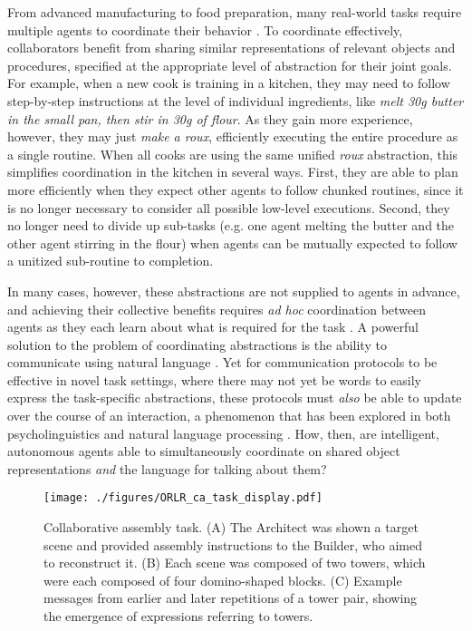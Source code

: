 \documentclass[10pt,letterpaper]{article}
\begin{document}
From advanced manufacturing to food preparation, many real-world tasks require multiple agents to coordinate their behavior \cite{grosz1996collaborative,stone2010ad,wang2020too}. 
To coordinate effectively, collaborators benefit from sharing similar representations of relevant objects and procedures, specified at the appropriate level of abstraction for their joint goals.
For example, when a new cook is training in a kitchen, they may need to follow step-by-step instructions at the level of individual ingredients, like \emph{melt 30g butter in the small pan, then stir in 30g of flour}.
As they gain more experience, however, they may just \emph{make a roux}, efficiently executing the entire procedure as a single routine. 
When all cooks are using the same unified \emph{roux} abstraction, this simplifies coordination in the kitchen in several ways.
First, they are able to plan more efficiently when they expect other agents to follow chunked routines, since it is no longer necessary to consider all possible low-level executions.
Second, they no longer need to divide up sub-tasks (e.g. one agent melting the butter and the other agent stirring in the flour) when agents can be mutually expected to follow a unitized sub-routine to completion.

In many cases, however, these abstractions are not supplied to agents in advance, and achieving their collective benefits requires \textit{ad hoc} coordination between agents as they each learn about what is required for the task \cite{wang2017naturalizing}.
A powerful solution to the problem of coordinating abstractions is the ability to communicate using natural language \cite{suhr2019executing,tellex2020robots}.
Yet for communication protocols to be effective in novel task settings, where there may not yet be words to easily express the task-specific abstractions, these protocols must \emph{also} be able to update over the course of an interaction, a phenomenon that has been explored in both psycholinguistics \cite{clark1996using, hawkins2020characterizing} and natural language processing \cite{hawkins2019continual}. 
How, then, are intelligent, autonomous agents able to simultaneously coordinate on shared object representations \emph{and} the language for talking about them?


\begin{figure*}[ht]
\begin{center}
\texttt{[image: ./figures/ORLR\_ca\_task\_display.pdf]}
\vspace{-1em}
\caption{Collaborative assembly task. (A) The Architect was shown a target scene and provided assembly instructions to the Builder, who aimed to reconstruct it. (B) Each scene was composed of two towers, which were each composed of four domino-shaped blocks. (C) Example messages from earlier and later repetitions of a tower pair, showing the emergence of expressions referring to towers.}
\vspace{-1em}
\label{fig:task}
\end{center}
\end{figure*}
\end{document}
